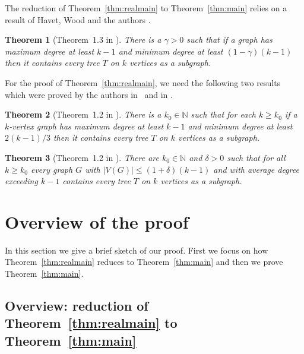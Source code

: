 \documentclass[12pt]{article}
\newtheorem{theorem}{Theorem}[section]
\begin{document}
The reduction of Theorem~\ref{thm:realmain} to Theorem~\ref{thm:main} relies on a result of Havet, Wood and the authors \cite{HRSW20}. %
\begin{theorem}[Theorem~1.3 in \cite{HRSW20}]
\label{thmHRSW}
 There is a $\gamma > 0$ such that if a graph has maximum degree at least $k-1$ and minimum degree at least $(1-\gamma) (k-1)$ then it contains every tree $T$ on $k$ vertices as a subgraph.\end{theorem}
 
For the proof of Theorem~\ref{thm:realmain}, we need the following two results which were  proved by the authors in~\cite{RS23a, RS23b} and in \cite{RS25}. 
 
\begin{theorem}[Theorem~1.2 in \cite{RS23b}]
\label{thmRS}
 There is a $k_0\in \mathbb N$ such that for each $k\ge k_0$ if a $k$-vertex graph has maximum degree at least $k-1$ and minimum degree at least $2 (k-1)/3$ then it contains every tree $T$ on $k$ vertices as a subgraph.
 \end{theorem}
 
\begin{theorem}[Theorem~1.2 in \cite{RS25}]
\label{thmRS25}
There are $k_0 \in\mathbb N$ and $\delta>0$ such that for all $k\ge k_0$ every graph $G$ with $|V (G)| \le (1 + \delta)(k-1)$  and with average degree exceeding $k - 1$ contains  every tree $T$ on $k$ vertices as a subgraph.
 \end{theorem}




\section{Overview of the proof}\label{proofov}

In this section we give a brief sketch of our proof. First 
we focus on how
Theorem~\ref{thm:realmain}
reduces to
Theorem~\ref{thm:main}
and then we prove 
Theorem~\ref{thm:main}. %




\subsection{Overview: reduction of Theorem~\ref{thm:realmain} to Theorem~\ref{thm:main}}
\end{document}
